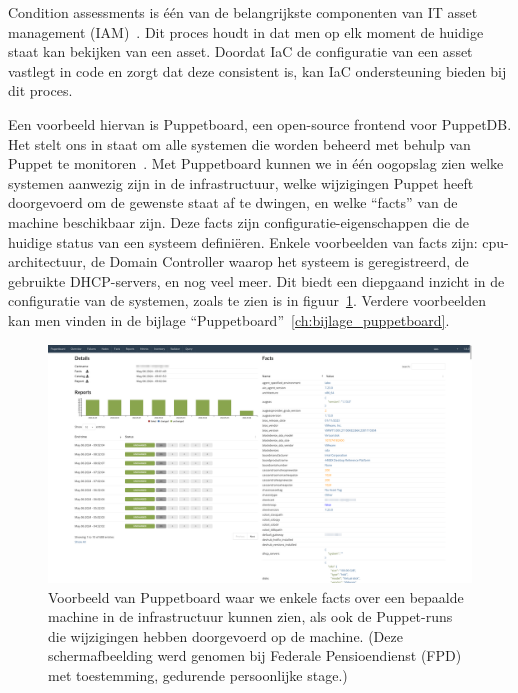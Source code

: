 Condition assessments is \'e\'en van de belangrijkste componenten van IT asset management (IAM)~\autocite{ibm-what-is-iam}.
Dit proces houdt in dat men op elk moment de huidige staat kan bekijken van een asset.
Doordat IaC de configuratie van een asset vastlegt in code en zorgt dat deze consistent is, kan IaC ondersteuning bieden bij dit proces.

Een voorbeeld hiervan is Puppetboard, een open-source frontend voor PuppetDB.
Het stelt ons in staat om alle systemen die worden beheerd met behulp van Puppet te monitoren~\autocite{puppetboard-github}.
Met Puppetboard kunnen we in \'e\'en oogopslag zien welke systemen aanwezig zijn in de infrastructuur, welke wijzigingen Puppet heeft doorgevoerd om de gewenste staat af te dwingen, en welke ``facts'' van de machine beschikbaar zijn.
Deze facts zijn configuratie-eigenschappen die de huidige status van een systeem defini\"eren.
Enkele voorbeelden van facts zijn: cpu-architectuur, de Domain Controller waarop het systeem is geregistreerd, de gebruikte DHCP-servers, en nog veel meer.
Dit biedt een diepgaand inzicht in de configuratie van de systemen, zoals te zien is in figuur~\ref{fig:puppetboard-host-details}.
Verdere voorbeelden kan men vinden in de bijlage ``Puppetboard''~\ref{ch:bijlage_puppetboard}.

\begin{figure}[h!]
    \includegraphics[width=\textwidth]
    {./graphics/state-of-the-art/puppetboard/puppetboard-host-details.png}
    \caption[Puppetboard host details.]{\label{fig:puppetboard-host-details}Voorbeeld van Puppetboard waar we enkele facts over een bepaalde machine in de infrastructuur kunnen zien, als ook de Puppet-runs die wijzigingen hebben doorgevoerd op de machine. (Deze schermafbeelding werd genomen bij Federale Pensioendienst (FPD) met toestemming, gedurende persoonlijke stage.)}
\end{figure}

